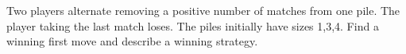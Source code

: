 Two players alternate removing a positive number of matches from one pile. The player taking the last match loses. The piles initially have sizes 1,3,4. Find a winning first move and describe a winning strategy.
